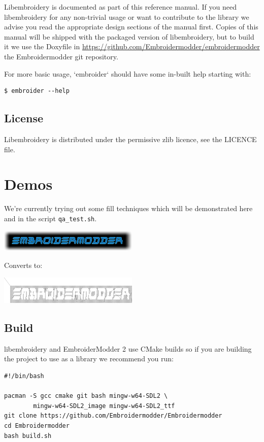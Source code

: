 \documentclass[10pt]{report}
\begin{document}
Libembroidery is documented as part of this reference manual. If you need
libembroidery for any non-trivial usage or want to contribute to the library we
advise you read the appropriate design sections of the manual first. Copies of
this manual will be shipped with the packaged version of libembroidery, but to
build it we use the Doxyfile in
\url{https://github.com/Embroidermodder/embroidermodder} the Embroidermodder git
repository.

For more basic usage, `embroider` should have some in-built help
starting with:

\begin{lstlisting}
$ embroider --help
\end{lstlisting}

\subsection{License}

Libembroidery is distributed under the permissive zlib licence, see the LICENCE
file.

\section{Demos}

We're currently trying out some fill techniques which will be demonstrated here
and in the script \texttt{qa\_test.sh}.

\includegraphics[width=0.5\textwidth]{images/examples/logo.png}

Converts to:

\includegraphics[width=0.5\textwidth]{images/examples/crossstitch_logo.png}

\subsection{Build}

libembroidery and EmbroiderModder 2 use CMake builds
so if you are building the project to use as a library we recommend
you run:

\begin{lstlisting}
#!/bin/bash

pacman -S gcc cmake git bash mingw-w64-SDL2 \
        mingw-w64-SDL2_image mingw-w64-SDL2_ttf
git clone https://github.com/Embroidermodder/Embroidermodder
cd Embroidermodder
bash build.sh
\end{lstlisting}
\end{document}
